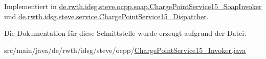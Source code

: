 Implementiert in \hyperlink{classde_1_1rwth_1_1idsg_1_1steve_1_1ocpp_1_1soap_1_1_charge_point_service15___soap_invoker_a7a80cacd445a2d5da5c26cad7cfc0741}{de.\-rwth.\-idsg.\-steve.\-ocpp.\-soap.\-Charge\-Point\-Service15\-\_\-\-Soap\-Invoker} und \hyperlink{classde_1_1rwth_1_1idsg_1_1steve_1_1service_1_1_charge_point_service15___dispatcher_a795a1aa4bb5733b36d280862e910d5fd}{de.\-rwth.\-idsg.\-steve.\-service.\-Charge\-Point\-Service15\-\_\-\-Dispatcher}.



Die Dokumentation für diese Schnittstelle wurde erzeugt aufgrund der Datei\-:\begin{DoxyCompactItemize}
\item 
src/main/java/de/rwth/idsg/steve/ocpp/\hyperlink{_charge_point_service15___invoker_8java}{Charge\-Point\-Service15\-\_\-\-Invoker.\-java}\end{DoxyCompactItemize}
